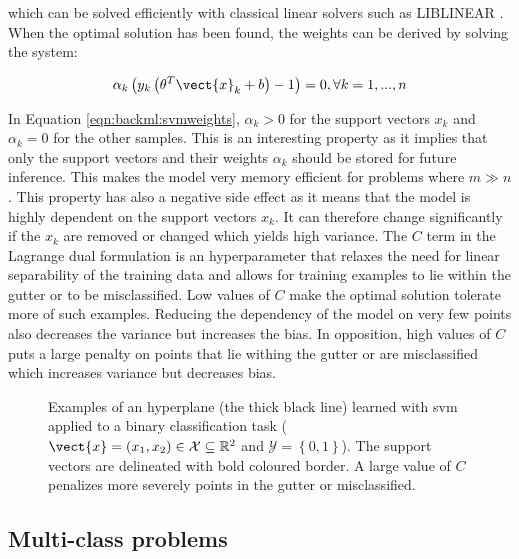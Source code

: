 which can be solved efficiently with classical linear solvers such as LIBLINEAR \parencite{fan2008liblinear}. When the optimal solution has been found, the weights can be derived by solving the system: 

\begin{equation}
\label{eqn:backml:svmweights}
\alpha_k\left(y_k \left(\theta^T \vect{x}_k + b\right) - 1\right) = 0, \forall k = 1, ..., n
\end{equation}

In Equation \ref{eqn:backml:svmweights}, $\alpha_k > 0$ for the support vectors $x_k$ and $\alpha_k = 0$ for the other samples. This is an interesting property as it implies that only the support vectors and their weights $\alpha_k$ should be stored for future inference. This makes the model very memory efficient for problems where $m \gg n$. This property has also a negative side effect as it means that the model is highly dependent on the support vectors $x_k$. It can therefore change significantly if the $x_k$ are removed or changed which yields high variance. The $C$ term in the Lagrange dual formulation is an hyperparameter that relaxes the need for linear separability of the training data and allows for training examples to lie within the gutter or to be misclassified. Low values of $C$ make the optimal solution tolerate more of such examples. Reducing the dependency of the model on very few points also decreases the variance but increases the bias. In opposition, high values of $C$ puts a large penalty on points that lie withing the gutter or are misclassified which increases variance but decreases bias. 

\begin{figure}
  \centering
  \caption{Examples of an hyperplane (the thick black line) learned with \acrshort{svm} applied to a binary classification task ($\vect{x} = (x_1, x_2) \in \mathcal{X} \subseteq \mathbb{R}^2$ and $\mathcal{Y} = \left\{0, 1\right\}$). The support vectors are delineated with bold coloured border. A large value of $C$ penalizes more severely points in the gutter or misclassified.}
  \label{fig:backml:svm}
\end{figure}


\subsection{Multi-class problems}

